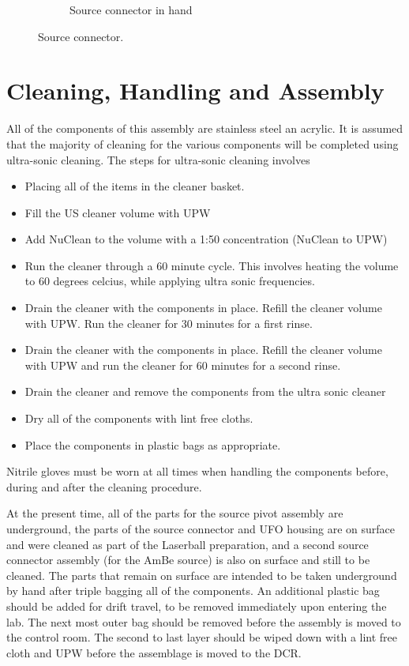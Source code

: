 \documentclass[12pt]{article}
\begin{document}
\begin{figure}
\begin{center}
\begin{subfigure}{0.4\textwidth}
  \caption{Source connector in hand}
  \label{fig:SCP}
\end{subfigure}
\end{center}
\caption{Source connector.}
\end{figure}

\section{Cleaning, Handling and Assembly}

All of the components of this assembly are stainless steel an
acrylic. It is assumed that the majority of cleaning for the various
components will be completed using ultra-sonic cleaning. The steps for
ultra-sonic cleaning involves
\begin{itemize}
\item Placing all of the items in the cleaner basket.
\item Fill the US cleaner volume with UPW
\item Add NuClean to the volume with a 1:50 concentration (NuClean to UPW)
\item Run the cleaner through a 60 minute cycle. This involves heating
  the volume to 60 degrees celcius, while applying ultra sonic
  frequencies.
\item Drain the cleaner with the components in place. Refill the
  cleaner volume with UPW. Run the cleaner for 30 minutes for a first
  rinse.
\item Drain the cleaner with the components in place. Refill the
  cleaner volume with UPW and run the cleaner for 60 minutes for a
  second rinse.
\item Drain the cleaner and remove the components from the ultra sonic cleaner
\item Dry all of the components with lint free cloths.
\item Place the components in plastic bags as appropriate.
\end{itemize}
Nitrile gloves must be worn at all times when handling the components
before, during and after the cleaning procedure.

At the present time, all of the parts for the source pivot assembly
are underground, the parts of the source connector and UFO housing are
on surface and were cleaned as part of the Laserball preparation, and
a second source connector assembly (for the AmBe source) is also on
surface and still to be cleaned. The parts that remain on surface are
intended to be taken underground by hand after triple bagging all of
the components. An additional plastic bag should be added for drift
travel, to be removed immediately upon entering the lab. The next most
outer bag should be removed before the assembly is moved to the
control room. The second to last layer should be wiped down with a
lint free cloth and UPW before the assemblage is moved to the DCR.
\end{document}
